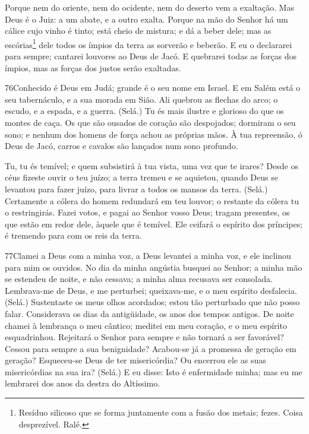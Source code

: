 Porque nem do oriente, nem do ocidente, nem do deserto vem a
exaltação. Mas Deus é o Juiz: a um abate, e a outro exalta.
Porque na mão do Senhor há um cálice cujo vinho é tinto; está
cheio de mistura; e dá a beber dele; mas as
escórias\footnote{Resíduo silicoso que se forma juntamente com a
fusão dos metais; fezes. Coisa desprezível. Ralé.} dele todos os
ímpios da terra as sorverão e beberão. E eu o declararei para
sempre; cantarei louvores ao Deus de Jacó. E quebrarei todas
as forças dos ímpios, mas as forças dos justos serão exaltadas.

\bigskip

\lettrine{76}{}Conhecido é Deus em Judá; grande é o seu nome em
Israel. E em Salém está o seu tabernáculo, e a sua morada em
Sião. Ali quebrou as flechas do arco; o escudo, e a espada, e a
guerra. (Selá.) Tu és mais ilustre e glorioso do que os montes
de caça. Os que são ousados de coração são despojados; dormiram
o seu sono; e nenhum dos homens de força achou as próprias mãos.
À tua repreensão, ó Deus de Jacó, carros e cavalos são lançados
num sono profundo.

Tu, tu és temível; e quem subsistirá à tua vista, uma vez que te
irares? Desde os céus fizeste ouvir o teu juízo; a terra tremeu
e se aquietou, quando Deus se levantou para fazer juízo, para
livrar a todos os mansos da terra. (Selá.) Certamente a
cólera do homem redundará em teu louvor; o restante da cólera tu o
restringirás. Fazei votos, e pagai ao Senhor vosso Deus;
tragam presentes, os que estão em redor dele, àquele que é temível.
Ele ceifará o espírito dos príncipes; é tremendo para com os
reis da terra.

\bigskip

\lettrine{77}{}Clamei a Deus com a minha voz, a Deus levantei a
minha voz, e ele inclinou para mim os ouvidos. No dia da minha
angústia busquei ao Senhor; a minha mão se estendeu de noite, e não
cessava; a minha alma recusava ser consolada. Lembrava-me de
Deus, e me perturbei; queixava-me, e o meu espírito desfalecia.
(Selá.) Sustentaste os meus olhos acordados; estou tão
perturbado que não posso falar. Considerava os dias da
antigüidade, os anos dos tempos antigos. De noite chamei à
lembrança o meu cântico; meditei em meu coração, e o meu espírito
esquadrinhou. Rejeitará o Senhor para sempre e não tornará a ser
favorável? Cessou para sempre a sua benignidade? Acabou-se já a
promessa de geração em geração? Esqueceu-se Deus de ter
misericórdia? Ou encerrou ele as suas misericórdias na sua ira?
(Selá.) E eu disse: Isto é enfermidade minha; mas eu me
lembrarei dos anos da destra do Altíssimo.

